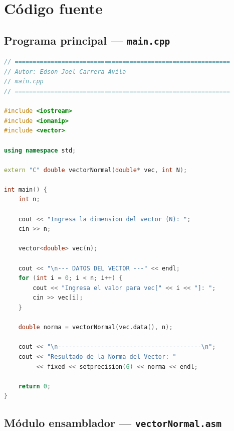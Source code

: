 \documentclass[12pt, letterpaper]{article}
\begin{document}
\section{Código fuente}

\subsection{Programa principal — \texttt{main.cpp}}

\begin{lstlisting}[language=CPP, caption={main.cpp -- Programa principal en C++}]
// ============================================================
// Autor: Edson Joel Carrera Avila
// main.cpp
// ============================================================

#include <iostream>
#include <iomanip>
#include <vector>

using namespace std;

extern "C" double vectorNormal(double* vec, int N);

int main() {
    int n;

    cout << "Ingresa la dimension del vector (N): ";
    cin >> n;

    vector<double> vec(n);

    cout << "\n--- DATOS DEL VECTOR ---" << endl;
    for (int i = 0; i < n; i++) {
        cout << "Ingresa el valor para vec[" << i << "]: ";
        cin >> vec[i];
    }

    double norma = vectorNormal(vec.data(), n);

    cout << "\n----------------------------------------\n";
    cout << "Resultado de la Norma del Vector: "
         << fixed << setprecision(6) << norma << endl;

    return 0;
}
\end{lstlisting}

\subsection{Módulo ensamblador — \texttt{vectorNormal.asm}}
\end{document}
